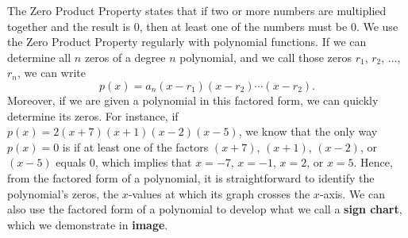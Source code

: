 \documentclass{ximera}
\begin{document}
The Zero Product Property states that if two or more numbers are multiplied together and the result is $0$, then at least one of the numbers must be $0$.  We use the Zero Product Property regularly with polynomial functions.  If we can determine all $n$ zeros of a degree $n$ polynomial, and we call those zeros $r_1$, $r_2$, $\ldots$, $r_n$, we can write%
$$
p(x) = a_n(x-r_1)(x-r_2) \cdots (x-r_2)\text{.}
$$
Moreover, if we are given a polynomial in this factored form, we can quickly determine its zeros.  For instance, if $p(x) = 2(x+7)(x+1)(x-2)(x-5)$, we know that the only way $p(x) = 0$ is if at least one of the factors $(x+7)$, $(x+1)$, $(x-2)$, or $(x-5)$ equals $0$, which implies that $x = -7$, $x = -1$, $x = 2$, or $x = 5$.  Hence, from the factored form of a polynomial, it is straightforward to identify the polynomial's zeros, the $x$-values at which its graph crosses the $x$-axis.  We can also use the factored form of a polynomial to develop what we call a \textbf{sign chart}, which we demonstrate in \textbf{image}. %
\end{document}
